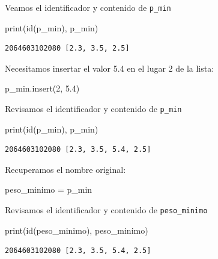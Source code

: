\documentclass[
  spanish,
  letterpaper,
]{scrbook}
\newenvironment{Shaded}{\begin{snugshade}}{\end{snugshade}}
\newcommand{\BuiltInTok}[1]{\textcolor[rgb]{0.00,0.23,0.31}{#1}}
\newcommand{\DecValTok}[1]{\textcolor[rgb]{0.68,0.00,0.00}{#1}}
\newcommand{\FloatTok}[1]{\textcolor[rgb]{0.68,0.00,0.00}{#1}}
\newcommand{\NormalTok}[1]{\textcolor[rgb]{0.00,0.23,0.31}{#1}}
\newcommand{\OperatorTok}[1]{\textcolor[rgb]{0.37,0.37,0.37}{#1}}
\theoremstyle{definition}
\theoremstyle{remark}
\begin{document}
Veamos el identificador y contenido de \texttt{p\_min}

\begin{Shaded}
\begin{Highlighting}[]
\BuiltInTok{print}\NormalTok{(}\BuiltInTok{id}\NormalTok{(p\_min), p\_min)}
\end{Highlighting}
\end{Shaded}

\begin{verbatim}
2064603102080 [2.3, 3.5, 2.5]
\end{verbatim}

Necesitamos insertar el valor 5.4 en el lugar 2 de la lista:

\begin{Shaded}
\begin{Highlighting}[]
\NormalTok{p\_min.insert(}\DecValTok{2}\NormalTok{, }\FloatTok{5.4}\NormalTok{)}
\end{Highlighting}
\end{Shaded}

Revisamos el identificador y contenido de \texttt{p\_min}

\begin{Shaded}
\begin{Highlighting}[]
\BuiltInTok{print}\NormalTok{(}\BuiltInTok{id}\NormalTok{(p\_min), p\_min)}
\end{Highlighting}
\end{Shaded}

\begin{verbatim}
2064603102080 [2.3, 3.5, 5.4, 2.5]
\end{verbatim}

Recuperamos el nombre original:

\begin{Shaded}
\begin{Highlighting}[]
\NormalTok{peso\_minimo }\OperatorTok{=}\NormalTok{ p\_min}
\end{Highlighting}
\end{Shaded}

Revisamos el identificador y contenido de \texttt{peso\_minimo}

\begin{Shaded}
\begin{Highlighting}[]
\BuiltInTok{print}\NormalTok{(}\BuiltInTok{id}\NormalTok{(peso\_minimo), peso\_minimo)}
\end{Highlighting}
\end{Shaded}

\begin{verbatim}
2064603102080 [2.3, 3.5, 5.4, 2.5]
\end{verbatim}
\end{document}
